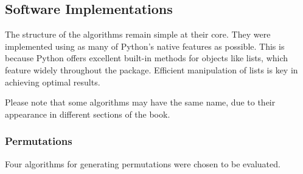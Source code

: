 \documentclass[12pt]{article}
\begin{document}
\subsection{Software Implementations}
The structure of the algorithms remain simple at their core. They were implemented using as many of Python's native features as possible. This is because Python offers excellent built-in methods for objects like lists, which feature widely throughout the package. Efficient manipulation of lists is key in achieving optimal results.

Please note that some algorithms may have the same name, due to their appearance in different sections of the book.

\subsubsection{Permutations}
Four algorithms for generating permutations were chosen to be evaluated.
\end{document}
